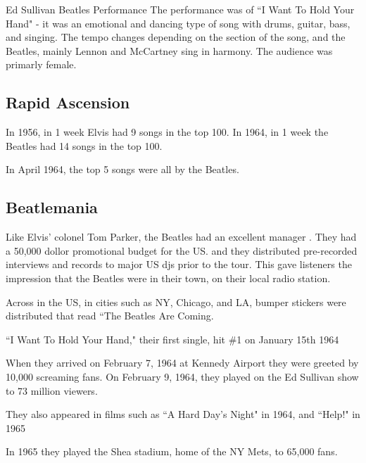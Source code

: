 \documentclass[12pt, a4paper, twoside, openright, titlepage]{book}
\begin{document}
\begin{rmk}{Ed Sullivan Beatles Performance}{}
    The performance was of ``I Want To Hold Your Hand" - it was an emotional and dancing type of song with drums, guitar, bass, and singing. The tempo changes depending on the section of the song, and the Beatles, mainly Lennon and McCartney sing in harmony. The audience was primarly female.
\end{rmk}

\subsection{Rapid Ascension}

\begin{note}{}{}
    In 1956, in 1 week Elvis had 9 songs in the top 100. In 1964, in 1 week the Beatles had 14 songs in the top 100.
\end{note}

In April 1964, the top 5 songs were all by the Beatles.

\subsection{Beatlemania}

Like Elvis' colonel Tom Parker, the Beatles had an excellent manager . They had a 50,000 dollor promotional budget for the US. and they distributed pre-recorded interviews and records to major US djs prior to the tour. This gave listeners the impression that the Beatles were in their town, on their local radio station. 


Across in the US, in cities such as NY, Chicago, and LA,  bumper stickers were distributed that read ``The Beatles Are Coming.

\begin{rmk}{}{}
    ``I Want To Hold Your Hand," their first single, hit \#1 on January 15th 1964
\end{rmk}

When they arrived on February 7, 1964 at Kennedy Airport they were greeted by 10,000 screaming fans. On February 9, 1964, they played on the Ed Sullivan show to 73 million viewers.

\begin{note}{}{}
    They also appeared in films such as ``A Hard Day's Night" in 1964, and ``Help!" in 1965
\end{note}

In 1965 they played the Shea stadium, home of the NY Mets, to 65,000 fans.
\end{document}
